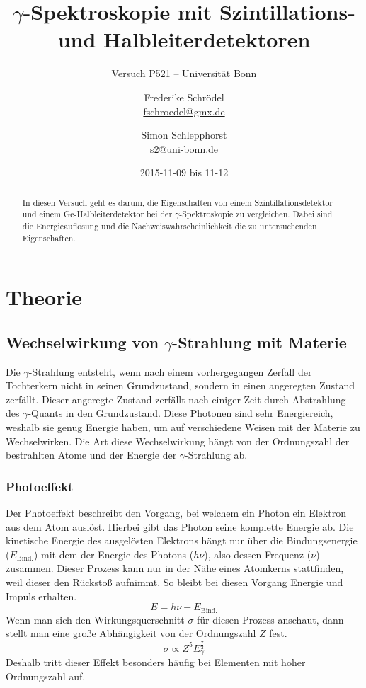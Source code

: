 \documentclass[11pt, ngerman, fleqn, DIV=15, headinclude, BCOR=2cm]{scrreprt}
\title{$\gamma$-Spektroskopie mit Szintillations- und Halbleiterdetektoren}
\subtitle{Versuch P521 -- Universität Bonn}
\author{
	Frederike Schrödel \\
	\small{\href{mailto:fschroedel@gmx.de}{fschroedel@gmx.de}}
	\and
	Simon Schlepphorst \\
	\small{\href{mailto:s2@uni-bonn.de}{s2@uni-bonn.de}}
}
\date{2015-11-09 bis 11-12}
\begin{document}
\maketitle

\begin{abstract}
In diesen Versuch geht es darum, die Eigenschaften von einem
Szintillationsdetektor und einem Ge-Halbleiterdetektor bei der
$\gamma$-Spektroskopie zu vergleichen.
Dabei sind die Energieauflösung und die Nachweiswahrscheinlichkeit die
zu untersuchenden Eigenschaften.
\end{abstract}


\tableofcontents

\chapter{Theorie}

\section{Wechselwirkung von $\gamma$-Strahlung mit Materie}
Die $\gamma$-Strahlung entsteht, wenn nach einem vorhergegangen Zerfall der
Tochterkern nicht in seinen Grundzustand, sondern in einen angeregten Zustand
zerfällt.
Dieser angeregte Zustand zerfällt nach einiger Zeit durch Abstrahlung des
$\gamma$-Quants in den Grundzustand. Diese Photonen sind sehr Energiereich,
weshalb sie genug Energie haben, um auf verschiedene Weisen mit der Materie zu
Wechselwirken.
Die Art diese Wechselwirkung hängt von der Ordnungszahl der bestrahlten Atome
und der Energie der $\gamma$-Strahlung ab.

\subsection{Photoeffekt}
Der Photoeffekt beschreibt den Vorgang, bei welchem ein Photon ein Elektron aus
dem Atom auslöst.
Hierbei gibt das Photon seine komplette Energie ab.
Die kinetische Energie des ausgelösten Elektrons hängt nur über die
Bindungsenergie ($E_\text{Bind.}$) mit dem der Energie des Photons ($h\nu$),
also dessen Frequenz ($\nu$) zusammen.
Dieser Prozess kann nur in der Nähe eines Atomkerns stattfinden, weil dieser
den Rückstoß aufnimmt.
So bleibt bei diesen Vorgang Energie und Impuls erhalten. 
\[ 
    E = h\nu - E_\text{Bind.}
\]
Wenn man sich den Wirkungsquerschnitt $\sigma$ für diesen Prozess anschaut,
dann stellt man eine große Abhängigkeit von der Ordnungszahl $Z$ fest.
\[
    \sigma \propto Z^5 E_\gamma^{\frac 72}
\]
Deshalb tritt dieser Effekt besonders häufig bei Elementen mit hoher Ordnungszahl
auf.
\end{document}
